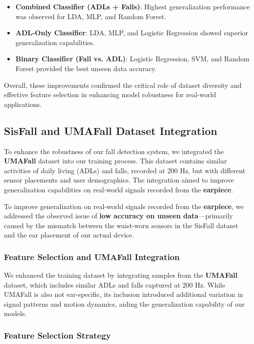 \documentclass[conference]{IEEEtran}
\begin{document}
\begin{itemize}
\item \textbf{Combined Classifier (ADLs + Falls)}: Highest generalization performance was observed for LDA, MLP, and Random Forest.
\item \textbf{ADL-Only Classifier}: LDA, MLP, and Logistic Regression showed superior generalization capabilities.
\item \textbf{Binary Classifier (Fall vs. ADL)}: Logistic Regression, SVM, and Random Forest provided the best unseen data accuracy.
\end{itemize}

Overall, these improvements confirmed the critical role of dataset diversity and effective feature selection in enhancing model robustness for real-world applications.

\subsection{SisFall and UMAFall Dataset Integration}
To enhance the robustness of our fall detection system, we integrated the \textbf{UMAFall} dataset into our training process. This dataset contains similar activities of daily living (ADLs) and falls, recorded at 200 Hz, but with different sensor placements and user demographics. The integration aimed to improve generalization capabilities on real-world signals recorded from the \textbf{earpiece}.

To improve generalization on real-world signals recorded from the \textbf{earpiece}, we addressed the observed issue of \textbf{low accuracy on unseen data}—primarily caused by the mismatch between the waist-worn sensors in the SisFall dataset and the ear placement of our actual device.

\subsubsection{Feature Selection and UMAFall Integration}


We enhanced the training dataset by integrating samples from the \textbf{UMAFall} dataset, which includes similar ADLs and falls captured at 200 Hz. While UMAFall is also not ear-specific, its inclusion introduced additional variation in signal patterns and motion dynamics, aiding the generalization capability of our models.

\subsubsection{Feature Selection Strategy}
\end{document}
